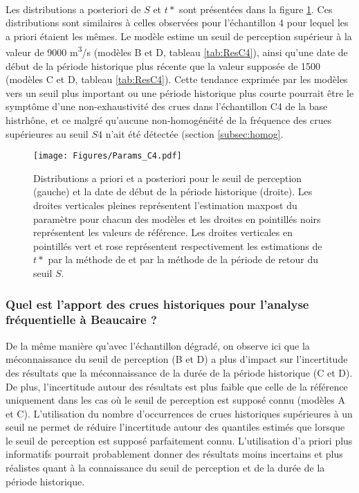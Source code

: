 \documentclass[11pt]{article}
\begin{document}
	\paragraph{} Les distributions a posteriori de $S$ et $t*$ sont présentées dans la figure \ref{fig:Params_C4}. Ces distributions sont similaires à celles observées pour l'échantillon 4 pour lequel les a priori étaient les mêmes. Le modèle estime un seuil de perception supérieur à la valeur de 9000 m\textsuperscript{3}/s (modèles B et D, tableau \ref{tab:ResC4}), ainsi qu'une date de début de la période historique plus récente que la valeur supposée de 1500 (modèles C et D, tableau \ref{tab:ResC4}). Cette tendance exprimée par les modèles vers un seuil plus important ou une période historique plus courte pourrait être le symptôme d'une non-exhaustivité des crues dans l'échantillon C4 de la base histrhône, et ce malgré qu'aucune non-homogénéité de la fréquence des crues supérieures au seuil $S4$ n'ait été détectée (section \ref{subsec:homog}.
	
	\begin{figure}[h]
		\centering
		\texttt{[image: Figures/Params\_C4.pdf]}	
		\caption{Distributions a priori et a posteriori pour le seuil de perception (gauche) et la date de début de la période historique (droite). Les droites verticales pleines représentent l'estimation maxpost du paramètre pour chacun des modèles et les droites en pointillés noirs représentent les valeurs de référence. Les droites verticales en pointillés vert et rose représentent respectivement les estimations de $t*$ par la méthode de \cite{prosdocimi_german_2018} et par la méthode de la période de retour du seuil $S$.}
		\label{fig:Params_C4}
	\end{figure}

		\subsubsection{Quel est l'apport des crues historiques pour l'analyse fréquentielle à Beaucaire ?}

	 De la même manière qu'avec l'échantillon dégradé, on observe ici que la méconnaissance du seuil de perception (B et D) a plus d'impact sur l'incertitude des résultats que la méconnaissance de la durée de la période historique (C et D). De plus, l'incertitude autour des résultats est plus faible que celle de la référence uniquement dans les cas où le seuil de perception est supposé connu (modèles A et C). L'utilisation du nombre d'occurrences de crues historiques supérieures à un seuil ne permet de réduire l'incertitude autour des quantiles estimés que lorsque le seuil de perception est supposé parfaitement connu. L'utilisation d'a priori plus informatifs pourrait probablement donner des résultats moins incertains et plus réalistes quant à la connaissance du seuil de perception et de la durée de la période historique.
	 
\end{document}
